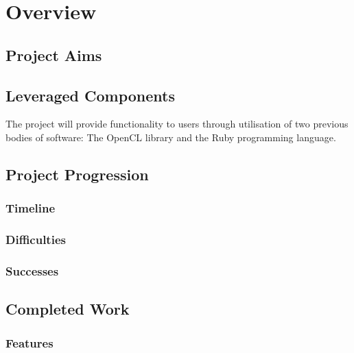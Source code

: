 \chapter{Overview}

\section{Project Aims}


\section{Leveraged Components}
The project will provide functionality to users through utilisation of two previous bodies of software: The \ac{OpenCL} library and the Ruby programming language.





\section{Project Progression}
\subsection{Timeline}

\subsection{Difficulties}

\subsection{Successes}

\section{Completed Work}
\subsection{Features}

